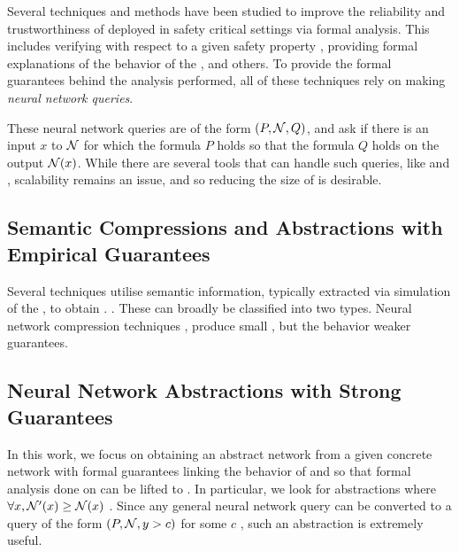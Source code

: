 Several techniques and methods have been studied to improve the reliability and
trustworthiness of \dnn deployed in safety critical settings via formal
analysis. This includes verifying \dnn with respect to a given
safety property \cite{reluplex, cegar-nn, deeppoly, cegarette, cleverest-nn,
conv-abs-gk, deep-abstract, lin-comb-abs-jan}, providing formal explanations of
the behavior of the \dnn \cite{minimal-image-fxai, overview-fxai}, and others.
 To provide the
formal guarantees behind the analysis performed, all of these techniques rely on
making \textit{neural network queries}. 

These neural network queries are of the form $(P, \mathcal{N}, Q)$, and ask if
there is an input $x$ to $\mathcal{N}$ for which the formula $P$ holds so that
the formula $Q$ holds on the output $\mathcal{N}(x)$. While there are several
tools that can handle such queries, like \marabou and \abcrown, scalability
remains an issue, and so reducing the size of \cnc is desirable.

\subsection{Semantic Compressions and Abstractions with Empirical Guarantees}

Several techniques utilise semantic information, typically extracted via
simulation of the \dnn, to obtain \abs. .
These can broadly be classified into two types. Neural network compression
techniques , produce small \abs, but the behavior 
weaker guarantees.

\subsection{Neural Network Abstractions with Strong Guarantees}

In this work, we focus on obtaining an abstract network \abs from a given
concrete network \cnc with formal guarantees linking the behavior of \abs and
\cnc so that formal analysis done on \abs can be lifted to \cnc. In particular,
we look for abstractions where $\forall x, \mathcal{N'}(x) \geq \mathcal{N}(x)$ . Since any
general neural network query can be converted to a query of the form $(P, \mathcal{N},
y > c)$ for some $c$ \cite{cegar-nn}, such an abstraction is extremely useful.

